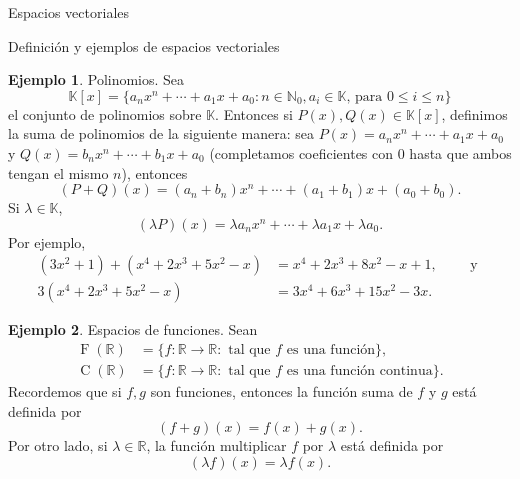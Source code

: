 \documentclass[a4paper,12pt,twoside,spanish,reqno]{amsbook}
\theoremstyle{definition}
\newtheorem{ejemplo}{Ejemplo}[section]
\theoremstyle{remark}
\newcommand{\R}{\mathbb R}
\newcommand{\K}{\mathbb K}
\begin{document}
\begin{chapter}{Espacios vectoriales}
\begin{section}{Definición y ejemplos de espacios vectoriales}
            \begin{ejemplo}{\sc Polinomios.} Sea 
                \begin{equation*}
                \K[x] = \{a_nx^n + \cdots + a_1x + a_0: n \in \mathbb N_0, a_i \in \K\text{, para } 0\le i \le n  \}
                \end{equation*}
                el conjunto de polinomios sobre $\K$. Entonces si $P(x), Q(x) \in \K[x]$, definimos la suma de polinomios de la siguiente manera: sea $P(x) = a_nx^n + \cdots + a_1x + a_0$ y $Q(x)= b_nx^n + \cdots + b_1x + a_0$ (completamos coeficientes con 0 hasta que ambos tengan el mismo $n$), entonces
                \begin{equation*}
                (P+Q)(x) = (a_n+b_n)x^n + \cdots + (a_1+ b_1)x + (a_0+b_0).
                \end{equation*}
                Si $\lambda \in \K$, 
                \begin{equation*}
                (\lambda P)(x) = \lambda a_nx^n + \cdots + \lambda a_1x + \lambda a_0.
                \end{equation*}
                Por ejemplo,
                \begin{align*}
                (3x^2 + 1)+(x^4 + 2x^3 + 5x^2-x) &= x^4 + 2x^3 + 8x^2-x +1, \qquad \text{ y } \\
                3(x^4 + 2x^3 + 5x^2-x) &= 3x^4 + 6x^3 + 15x^2-3x.
                \end{align*}
            \end{ejemplo}
            
            
            \medspace
            
            \begin{ejemplo}{\sc Espacios de funciones.} Sean
                \begin{align*}
                \operatorname{F}(\R) &= \{f: \R \to \R: \text{ tal que } f \text{ es una función} \},\\
                \operatorname{C}(\R) &= \{f: \R \to \R: \text{ tal que }  f  \text{ es una función continua} \}.
                \end{align*}
                Recordemos que si $f,g$ son funciones, entonces la función suma de $f$ y $g$ está definida por
                \begin{equation*}
                (f+g)(x) = f(x) + g(x).
                \end{equation*}
                Por otro lado, si $\lambda \in \R$, la función multiplicar $f$ por $\lambda $ está definida por
                \begin{equation*}
                (\lambda f)(x) = \lambda f(x).
                \end{equation*}			
                                

\end{ejemplo}
\end{section}
\end{chapter}
\end{document}
